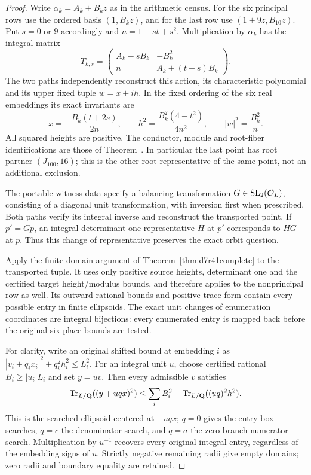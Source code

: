 \begin{proof}
Write $\alpha_k=A_k+B_kz$ as in the arithmetic census. For the six
principal rows use the ordered basis $(1,B_kz)$, and for the last row
use $(1+9z,B_{10}z)$. Put $s=0$ or $9$ accordingly and
$n=1+st+s^2$. Multiplication by $\alpha_k$ has the integral matrix
\[
 T_{k,s}=\begin{pmatrix}
 A_k-sB_k&-B_k^2\\
 n&A_k+(t+s)B_k
 \end{pmatrix}.
\]
The two paths independently reconstruct this action, its characteristic
polynomial and its upper fixed tuple $w=x+ih$. In the fixed ordering of
the six real embeddings its exact invariants are
\[
 x=-\frac{B_k(t+2s)}{2n},\qquad
 h^2=\frac{B_k^2(4-t^2)}{4n^2},\qquad
 |w|^2=\frac{B_k^2}{n}.
\]
All squared heights are positive. The conductor, module and root-fiber
identifications are those of Theorem~.
In particular the last point has root partner
$(J_{100},16)$; this is the other root representative of the same point,
not an additional exclusion.

The portable witness data specify a balancing transformation
$G\in\operatorname{SL}_2(\mathcal O_L)$, consisting of a diagonal unit transformation,
with inversion first when prescribed. Both paths verify its integral
inverse and reconstruct the transported point. If $p'=Gp$, an integral
determinant-one representative $H$ at $p'$ corresponds to $HG$ at $p$.
Thus this change of representative preserves the exact orbit question.

Apply the finite-domain argument of
Theorem~\ref{thm:d7r41complete} to the transported tuple. It uses only
positive source heights, determinant one and the certified target
height/modulus bounds, and therefore applies to the nonprincipal row
as well. Its outward rational bounds and positive trace form contain
every possible entry in finite ellipsoids. The exact unit changes of
enumeration coordinates are integral bijections: every enumerated entry
is mapped back before the original six-place bounds are tested.

For clarity, write an original shifted bound at embedding $i$ as
$|v_i+q_i x_i|^2+q_i^2h_i^2\le L_i^2$.
For an integral unit $u$, choose certified rational
$B_i\ge |u_i|L_i$ and set $y=uv$.
Then every admissible $v$ satisfies
\[
 \operatorname{Tr}_{L/\mathbf Q}((y+uqx)^2)
 \le \sum_i B_i^2-\operatorname{Tr}_{L/\mathbf Q}((uq)^2h^2).
\]
This is the searched ellipsoid centered at $-uqx$;
$q=0$ gives the entry-box searches, $q=c$ the denominator search,
and $q=a$ the zero-branch numerator search.
Multiplication by $u^{-1}$ recovers every original integral entry,
regardless of the embedding signs of $u$.
Strictly negative remaining radii give empty domains; zero radii and
boundary equality are retained.


\end{proof}
